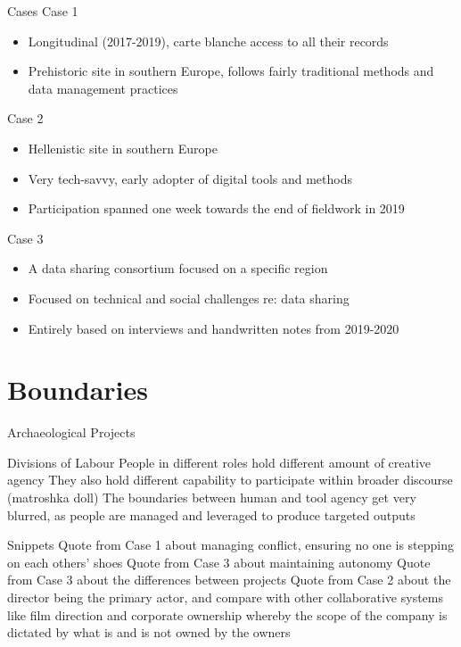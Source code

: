 \documentclass{beamer}
\begin{document}
\begin{frame}{Cases}
  Case 1
  \begin{itemize}
    \item Longitudinal (2017-2019), carte blanche access to all their records
    \item Prehistoric site in southern Europe, follows fairly traditional methods and data management practices
  \end{itemize}

  Case 2
  \begin{itemize}
    \item Hellenistic site in southern Europe
    \item Very tech-savvy, early adopter of digital tools and methods
    \item Participation spanned one week towards the end of fieldwork in 2019
  \end{itemize}

  Case 3
  \begin{itemize}
    \item A data sharing consortium focused on a specific region
    \item Focused on technical and social challenges re: data sharing
    \item Entirely based on interviews and handwritten notes from 2019-2020
  \end{itemize}
\end{frame}

\section{Boundaries}
\begin{frame}{Archaeological Projects}
  
\end{frame}

\begin{frame}{Divisions of Labour}
  People in different roles hold different amount of creative agency
  They also hold different capability to participate within broader discourse (matroshka doll)
  The boundaries between human and tool agency get very blurred, as people are managed and leveraged to produce targeted outputs
  
\end{frame}

\begin{frame}{Snippets}
  Quote from Case 1 about managing conflict, ensuring no one is stepping on each others' shoes
  Quote from Case 3 about maintaining autonomy
  Quote from Case 3 about the differences between projects
  Quote from Case 2 about the director being the primary actor, and compare with other collaborative systems like film direction and corporate ownership whereby the scope of the company is dictated by what is and is not owned by the owners
  
\end{frame}
\end{document}
